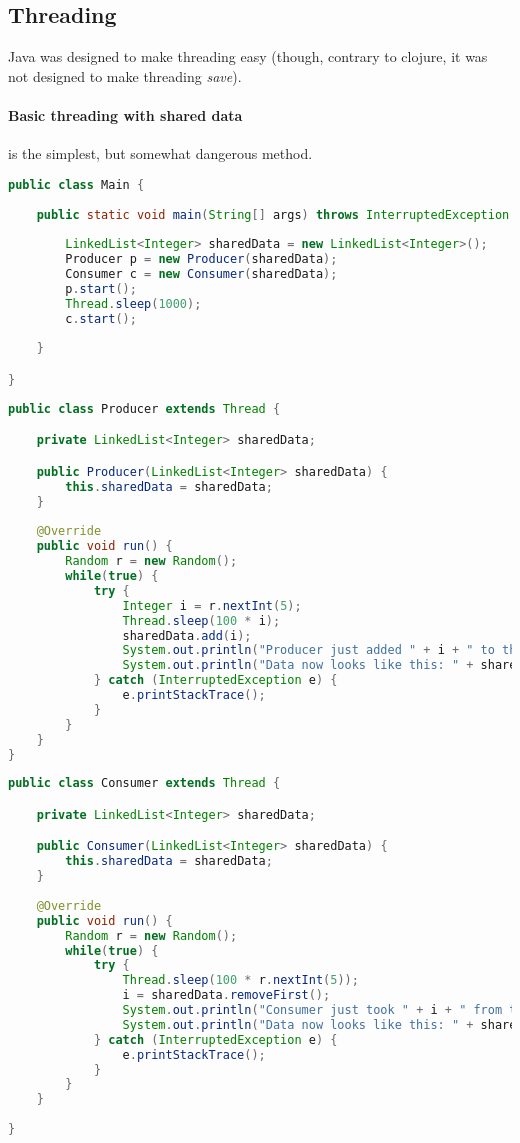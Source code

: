 \subsection{Threading}

Java was designed to make threading easy (though, contrary to clojure, it was not designed to make threading \emph{save}). 

\paragraph{Basic threading with shared data} is the simplest, but somewhat dangerous method. 
\begin{lstlisting}[language=java]
public class Main {
	
	public static void main(String[] args) throws InterruptedException {
		
		LinkedList<Integer> sharedData = new LinkedList<Integer>();
		Producer p = new Producer(sharedData);
		Consumer c = new Consumer(sharedData);
		p.start();
		Thread.sleep(1000);
		c.start();
		
	}

}
\end{lstlisting}
\begin{lstlisting}[language=java]
public class Producer extends Thread {

	private LinkedList<Integer> sharedData;

	public Producer(LinkedList<Integer> sharedData) {
		this.sharedData = sharedData;
	}
	
	@Override
	public void run() {
		Random r = new Random();
		while(true) {
			try {
			    Integer i = r.nextInt(5);
				Thread.sleep(100 * i);
    			sharedData.add(i);
    			System.out.println("Producer just added " + i + " to the shared data.");
    			System.out.println("Data now looks like this: " + sharedData.toString());
			} catch (InterruptedException e) {
				e.printStackTrace();
			}
		}
	}
}
\end{lstlisting}
\begin{lstlisting}[language=java]
public class Consumer extends Thread {

	private LinkedList<Integer> sharedData;

	public Consumer(LinkedList<Integer> sharedData) {
		this.sharedData = sharedData;
	}
	
	@Override
	public void run() {
		Random r = new Random();
		while(true) {
			try {
				Thread.sleep(100 * r.nextInt(5));
				i = sharedData.removeFirst();
    			System.out.println("Consumer just took " + i + " from the shared data.");
    			System.out.println("Data now looks like this: " + sharedData.toString());
			} catch (InterruptedException e) {
				e.printStackTrace();
			}
		}
	}
	
}
\end{lstlisting}

